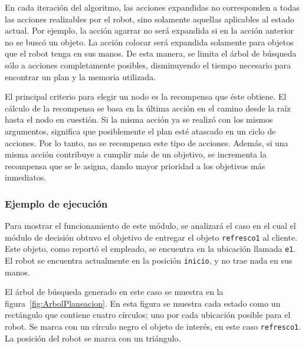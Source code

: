 \documentclass[11pt]{article}
\begin{document}
En cada iteración del algoritmo, las acciones expandidas no corresponden a todas las acciones realizables por el robot, sino solamente aquellas aplicables al estado actual. Por ejemplo, la acción agarrar no será expandida si en la acción anterior no se buscó un objeto. La acción colocar será expandida solamente para objetos que el robot tenga en sus manos. De esta manera, se limita el árbol de búsqueda sólo a acciones completamente posibles, disminuyendo el tiempo necesario para encontrar un plan y la memoria utilizada.

El principal criterio para elegir un nodo es la recompensa que éste obtiene. El cálculo de la recompensa se basa en la última acción en el camino desde la raíz hasta el nodo en cuestión. Si la misma acción ya se realizó con los mismos argumentos, significa que posiblemente el plan esté atascado en un ciclo de acciones. Por lo tanto, no se recompensa este tipo de acciones. Además, si una misma acción contribuye a cumplir más de un objetivo, se incrementa la recompensa que se le asigna, dando mayor prioridad a los objetivos más inmediatos.

\subsubsection{Ejemplo de ejecución}

Para mostrar el funcionamiento de este módulo, se analizará el caso en el cual el módulo de decisión obtuvo el objetivo de entregar el objeto \texttt{refresco1} al cliente. Este objeto, como reportó el empleado, se encuentra en la ubicación llamada \texttt{e1}. El robot se encuentra actualmente en la posición \texttt{inicio}, y no trae nada en sus manos.

El árbol de búsqueda generado en este caso se muestra en la figura~\ref{fig:ArbolPlaneacion}. En esta figura se muestra cada estado como un rectángulo que contiene cuatro círculos; uno por cada ubicación posible para el robot. Se marca con un círculo negro el objeto de interés, en este caso \texttt{refresco1}. La posición del robot se marca con un triángulo.
\end{document}
